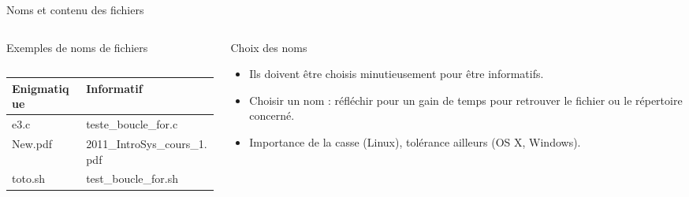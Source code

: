 \begin{frame}{Noms et contenu des fichiers}
\begin{columns}
\begin{column}{5.5cm}
\begin{block}{Exemples de noms de fichiers}
\begin{center}
\begin{tabular}{ll}
            \hline
          \end{tabular}
          \vfill
          \begin{tabular}{ll}
            \hline
            Enigmatique&Informatif\\
            \hline
            e3.c&teste\_boucle\_for.c\\
            New.pdf&2011\_IntroSys\_cours\_1.pdf\\
            toto.sh&test\_boucle\_for.sh\\
            \hline
          \end{tabular}
        \end{center}
      \end{block}
    \end{column}
    \begin{column}{5.5cm}
      \begin{alertblock}{Choix des noms}
        \begin{itemize}
        \item[\ddialoginformation] Ils doivent être choisis minutieusement pour être informatifs.
        \item[\ddialogsystem] Choisir un nom : réfléchir pour un gain de temps pour
          retrouver le fichier ou le répertoire concerné.
        \item[\ddialogwarning] Importance de la casse (Linux), tolérance
          ailleurs (OS X, Windows).
        \end{itemize}
      \end{alertblock}
    \end{column}
  \end{columns}
\end{frame}
